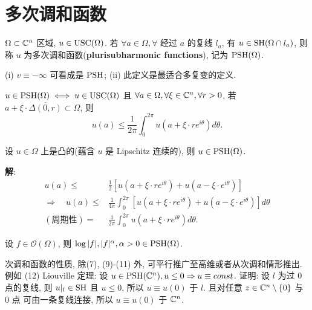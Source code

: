 \section{多次调和函数}

\begin{definition}
  $\Omega \subset {\mathbb C}^n$ 区域, $u \in \operatorname{USC}(\Omega )$. 若 $\forall a \in \Omega , \forall $ 经过 $a$ 的复线 $l_a$, 有 $u \in \operatorname{SH}(\Omega \cap l_a)$, 则 称 $u$ 为多次调和函数(\textbf{plurisubharmonic functions}), 记为 $\operatorname{PSH} (\Omega )$.        
\end{definition}

\begin{remark}
 (i) $v \equiv - \infty $ 可看成是 $\operatorname{PSH}$; 
 (ii) 此定义是最适合多复变的定义.
\end{remark}

\begin{remark}
  $u \in \operatorname{PSH} (\Omega ) \iff u \in \operatorname{USC}(\Omega )$ 且 $\forall a \in \Omega , \forall \xi \in {\mathbb C}^{n}, \forall r >0$, 若 $a+\xi  \cdot  \overline{\Delta (0,r)} \subset \Omega $, 则 
  $$ u(a) \leq \frac{1}{2 \pi } \int_{0}^{2 \pi } u(a+\xi \cdot  r e^{i \theta }) d \theta . $$   
\end{remark}

\begin{example}
  设 $u \in \Omega $ 上是凸的(蕴含 $u$  是 Lipschitz 连续的), 则 $u \in \operatorname{PSH} (\Omega )$.
  
 \noindent \textbf{解}: 
  $$ \begin{aligned}
    u(a) \leq & \frac{1}{2} [ u(a+\xi \cdot r e^{i \theta })+u(a-\xi \cdot e^{i \theta }) ]\\
   \Rightarrow \quad u(a) \leq & \frac{1}{4 \pi } \int_{0}^{2 \pi } [ u(a+\xi \cdot r e^{i \theta })+u(a-\xi \cdot e^{i \theta }) ] d \theta \\
   (\text{周期性})=&  \frac{1}{2 \pi } \int_{0}^{2 \pi }  u(a+\xi \cdot r e^{i \theta })d \theta .
  \end{aligned}  $$
\end{example}

\begin{example}
 设 $f \in \mathcal{O}(\Omega )$, 则 $\log|f|,|f|^{\alpha }, \alpha >0 \in  \operatorname{PSH}(\Omega )$.  
\end{example}

\begin{remark}
  次调和函数的性质, 除(7), (9)-(11) 外, 可平行推广至高维或者从次调和情形推出. 
  例如 (12) Liouville 定理: 设 $u \in \operatorname{PSH}({\mathbb C}^n ), u \leq 0 \Rightarrow u \equiv const$. 证明: 设 $l $ 为过 $0$ 点的复线, 则 $u|_{l} \in \operatorname{SH}$ 且 $u \leq 0$, 所以 $u \equiv u(0)$ 于 $l$. 且对任意 $z \in {\mathbb C}^n \setminus \{0\}$ 与 $0$ 点 可由一条复线连接, 所以 $u \equiv u(0)$ 于 ${\mathbb C}^n$.          
\end{remark}

